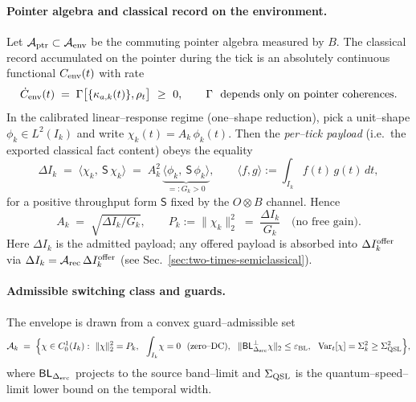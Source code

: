 \documentclass[10pt]{article}
\theoremstyle{definition}
\theoremstyle{plain}
\begin{document}
\paragraph{Pointer algebra and classical record on the environment.}\label{par:uom-main-031}
Let $\mathcal A_{\rm ptr}\subset\mathcal A_{\rm env}$ be the commuting pointer algebra
measured by $B$. The classical record accumulated on the pointer during the tick is an
absolutely continuous functional $C_{\rm env}(t)$ with rate
\begin{equation}
\dot C_{\rm env}(t)\;=\;\Gamma\big[\{\kappa_{a,k}(t)\},\rho_t\big]\ \ge\ 0,
\qquad \Gamma\ \ \text{depends only on pointer coherences.}
\label{eq:record-rate}
\end{equation}
In the calibrated linear–response regime (one–shape reduction), pick a unit–shape
$\phi_k\in L^2(I_k)$ and write $\chi_k(t)=A_k\,\phi_k(t)$. Then the \emph{per–tick payload}
(i.e.\ the exported classical fact content) obeys the equality
\begin{equation}
\Delta I_k\;=\;\langle \chi_k,\ \mathsf S\,\chi_k\rangle
\;=\;A_k^2\,\underbrace{\langle \phi_k,\ \mathsf S\,\phi_k\rangle}_{=:G_k>0},
\qquad \langle f,g\rangle:=\int_{I_k}\!f(t)\,g(t)\,dt,
\label{eq:payload-equality}
\end{equation}
for a positive throughput form $\mathsf S$ fixed by the $O\otimes B$ channel. Hence
\begin{equation}
A_k\;=\;\sqrt{\Delta I_k/G_k},\qquad
P_k:=\|\chi_k\|_2^2\;=\;\frac{\Delta I_k}{G_k}\quad\text{(no free gain).}
\label{eq:source-amplitude-fluence}
\end{equation}
Here $\Delta I_k$ is the admitted payload; any offered payload is absorbed into
$\Delta I_k^{\rm offer}$ via $\Delta I_k=\mathcal A_{\rm rec}\,\Delta I_k^{\rm offer}$
(see Sec.~\ref{sec:two-times-semiclassical}).

\paragraph{Admissible switching class and guards.}\label{par:uom-main-032}
The envelope is drawn from a convex guard–admissible set
\begin{equation}
\mathcal A_k\;=\;\Big\{\chi\in C_0^1(I_k):\
\|\chi\|_2^2=P_k,\ \ \int_{I_k}\!\chi=0\ \ (\text{zero–DC}),\ \
\|{\sf BL}_{\Delta_{\rm src}}^\perp\chi\|_2\le \varepsilon_{\rm BL},\ \
\mathrm{Var}_t[\chi]=\Sigma_k^2\ge \Sigma_{\rm QSL}^2\Big\},
\label{eq:admissible-class}
\end{equation}
where ${\sf BL}_{\Delta_{\rm src}}$ projects to the source band–limit and
$\Sigma_{\rm QSL}$ is the quantum–speed–limit lower bound on the temporal width.
\end{document}
